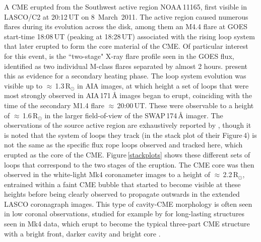 \documentclass[namedreferences]{solarphysics}
\begin{document}
\begin{article}
A CME erupted from the Southwest active region NOAA\,11165, first visible in LASCO/C2 at 20:12\,UT on 8~March~2011. The active region caused numerous flares during its evolution across the disk, among them an M4.4 flare at GOES start-time 18:08\,UT (peaking at 18:28\,UT) associated with the rising loop system that later erupted to form the core material of the CME. Of particular interest for this event, is the ``two-stage" X-ray flare profile seen in the GOES flux, identified as two individual M-class flares separated by almost 2 hours.  present this as evidence for a secondary heating phase. The loop system evolution was visible up to $\approx$\,1.3\,R$_{\odot}$ in AIA images, at which height a set of loops that were most strongly observed in AIA\,171\,{\AA} images began to erupt, coinciding with the time of the secondary M1.4 flare $\approx$\,20:00\,UT. These were observable to a height of $\approx$\,1.6\,R$_{\odot}$ in the larger field-of-view of the SWAP\,174\,{\AA} imager. The observations of the source active region are exhaustively reported by , though it is noted that the system of loops they track (in the stack plot of their Figure\,4) is not the same as the specific flux rope loops observed and tracked here, which erupted as the core of the CME. Figure\,\ref{stackplots} shows these different sets of loops that correspond to the two stages of the eruption. The CME core was then observed in the white-light Mk4 coronameter images to a height of $\approx$\,2.2\,R$_{\odot}$, entrained within a faint CME bubble that started to become visible at these heights before being clearly observed to propagate outwards in the extended LASCO coronagraph images. This type of cavity-CME morphology is often seen in low coronal observations, studied for example by  for long-lasting structures seen in Mk4 data, which erupt to become the typical three-part CME structure with a bright front, darker cavity and bright core \cite{1986JGR....9110951I}.  %


\end{article}
\end{document}
